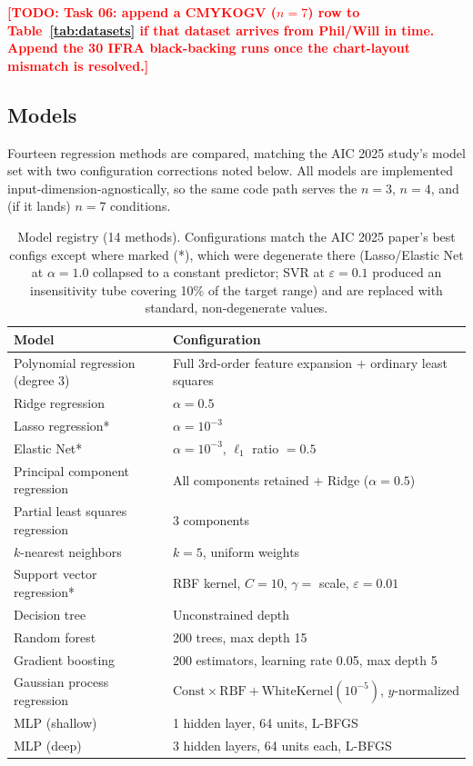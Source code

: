 \documentclass[11pt,a4paper]{article}
\newcommand{\todonote}[1]{\textcolor{red}{\textbf{[TODO: #1]}}}
\begin{document}
\todonote{Task 06: append a CMYKOGV ($n=7$) row to Table~\ref{tab:datasets}
if that dataset arrives from Phil/Will in time. Append the 30 IFRA
black-backing runs once the chart-layout mismatch is resolved.}

\subsection{Models}
\label{sec:models}

Fourteen regression methods are compared, matching the AIC 2025 study's
model set with two configuration corrections noted below. All models are
implemented input-dimension-agnostically, so the same code path serves the
$n=3$, $n=4$, and (if it lands) $n=7$ conditions.

\begin{table}[h]
\centering
\caption{Model registry (14 methods). Configurations match the AIC 2025
paper's best configs except where marked (*), which were degenerate there
(Lasso/Elastic Net at $\alpha=1.0$ collapsed to a constant predictor; SVR at
$\varepsilon=0.1$ produced an insensitivity tube covering 10\% of the target
range) and are replaced with standard, non-degenerate values.}
\label{tab:models}
\begin{tabular}{@{}ll@{}}
\toprule
Model & Configuration \\
\midrule
Polynomial regression (degree 3) & Full 3rd-order feature expansion + ordinary least squares \\
Ridge regression & $\alpha = 0.5$ \\
Lasso regression* & $\alpha = 10^{-3}$ \\
Elastic Net* & $\alpha = 10^{-3}$, $\ell_1$ ratio $= 0.5$ \\
Principal component regression & All components retained + Ridge ($\alpha=0.5$) \\
Partial least squares regression & 3 components \\
$k$-nearest neighbors & $k=5$, uniform weights \\
Support vector regression* & RBF kernel, $C=10$, $\gamma=$ scale, $\varepsilon = 0.01$ \\
Decision tree & Unconstrained depth \\
Random forest & 200 trees, max depth 15 \\
Gradient boosting & 200 estimators, learning rate 0.05, max depth 5 \\
Gaussian process regression & $\mathrm{Const} \times \mathrm{RBF} + \mathrm{WhiteKernel}(10^{-5})$, $y$-normalized \\
MLP (shallow) & 1 hidden layer, 64 units, L-BFGS \\
MLP (deep) & 3 hidden layers, 64 units each, L-BFGS \\
\bottomrule
\end{tabular}
\end{table}
\end{document}
